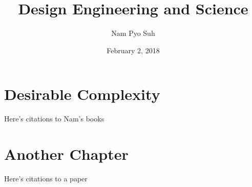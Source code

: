\documentclass[]{suhbook}
\title{Design Engineering and Science}
\author{Nam Pyo Suh}
\date{February 2, 2018}
\begin{document}

\setcounter{chapter}{21}%
\chapter{Desirable Complexity}
\ShowChapterInfo{}
\begin{chapterintro}  

  \lipsum[1]
\end{chapterintro}


\lipsum[2-12]

Here's citations to Nam's books\cite{suh1990principles,suh1998adsystems,suh2005complexity}

\printbibliography{}

\chapter{Another Chapter}
\ShowChapterInfo{}
\begin{chapterintro}  
  \lipsum[1]
\end{chapterintro}


\lipsum[2-12]

Here's citations to a paper\cite{bragason2015parachuterelease}

\printbibliography{}
\end{document}
